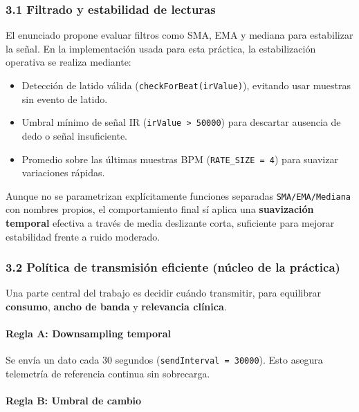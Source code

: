 \documentclass[11pt]{article}
\providecommand{\tightlist}{%
      \setlength{\itemsep}{0pt}\setlength{\parskip}{0pt}}
\begin{document}
\subsubsection{3.1 Filtrado y estabilidad de
lecturas}\label{filtrado-y-estabilidad-de-lecturas}

El enunciado propone evaluar filtros como SMA, EMA y mediana para
estabilizar la señal. En la implementación usada para esta práctica, la
estabilización operativa se realiza mediante:

\begin{itemize}
\tightlist
\item
  Detección de latido válida (\texttt{checkForBeat(irValue)}), evitando
  usar muestras sin evento de latido.
\item
  Umbral mínimo de señal IR (\texttt{irValue\ \textgreater{}\ 50000})
  para descartar ausencia de dedo o señal insuficiente.
\item
  Promedio sobre las últimas muestras BPM (\texttt{RATE\_SIZE\ =\ 4})
  para suavizar variaciones rápidas.
\end{itemize}

Aunque no se parametrizan explícitamente funciones separadas
\texttt{SMA/EMA/Mediana} con nombres propios, el comportamiento final sí
aplica una \textbf{suavización temporal} efectiva a través de media
deslizante corta, suficiente para mejorar estabilidad frente a ruido
moderado.

\subsubsection{3.2 Política de transmisión eficiente (núcleo de la
práctica)}\label{poluxedtica-de-transmisiuxf3n-eficiente-nuxfacleo-de-la-pruxe1ctica}

Una parte central del trabajo es decidir cuándo transmitir, para
equilibrar \textbf{consumo}, \textbf{ancho de banda} y
\textbf{relevancia clínica}.

\paragraph{Regla A: Downsampling
temporal}\label{regla-a-downsampling-temporal}

Se envía un dato cada 30 segundos (\texttt{sendInterval\ =\ 30000}).
Esto asegura telemetría de referencia continua sin sobrecarga.

\paragraph{Regla B: Umbral de cambio}\label{regla-b-umbral-de-cambio}
\end{document}

